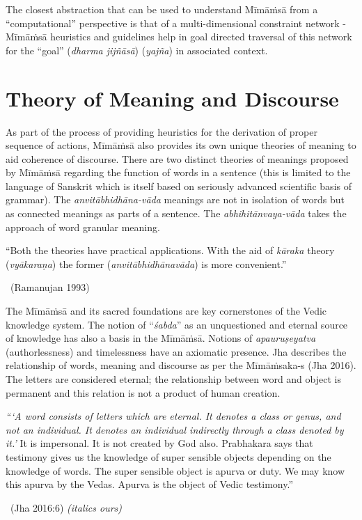 The closest abstraction that can be used to understand Mīmāṁsā from a “computational” perspective is that of a multi-dimensional constraint network - Mīmāṁsā heuristics and guidelines help in goal directed traversal of this network for the “goal” (\textit{dharma jijñāsā}) (\textit{yajña}) in associated context.

\section*{Theory of Meaning and Discourse}

As part of the process of providing heuristics for the derivation of proper sequence of actions, Mīmāṁsā also provides its own unique theories of meaning to aid coherence of discourse. There are two distinct theories of meanings proposed by Mīmāṁsā regarding the function of words in a sentence (this is limited to the language of Sanskrit which is itself based on seriously advanced scientific basis of grammar). The \textit{anvitābhidhāna-vāda} meanings are not in isolation of words but as connected meanings as parts of a sentence. The \textit{abhihitānvaya-vāda} takes the approach of word granular meaning.

\begin{myquote}
“Both the theories have practical applications. With the aid of \textit{kāraka} theory (\textit{vyākaraṇa}) the former (\textit{anvitābhidhānavāda}) is more convenient.”

~\hfill (Ramanujan 1993)
\end{myquote}

The Mīmāṁsā and its sacred foundations are key cornerstones of the Vedic knowledge system. The notion of “\textit{śabda}” as an unquestioned and eternal source of knowledge has also a basis in the Mīmāṁsā. Notions of \textit{apauruṣeyatva} (authorlessness) and timelessness have an axiomatic presence. Jha describes the relationship of words, meaning and discourse as per the Mīmāṁsaka-s (Jha 2016). The letters are considered eternal; the relationship between word and object is permanent and this relation is not a product of human creation.

\begin{myquote}
\textit{“‘A word consists of letters which are eternal. It denotes a class or genus, and not an individual. It denotes an individual indirectly through a class denoted by it.’} It is impersonal. It is not created by God also. Prabhakara says that testimony gives us the knowledge of super sensible objects depending on the knowledge of words. The super sensible object is apurva or duty. We may know this apurva by the Vedas. Apurva is the object of Vedic testimony.”

~\hfill (Jha 2016:6) \textit{(italics ours)}
\end{myquote}

